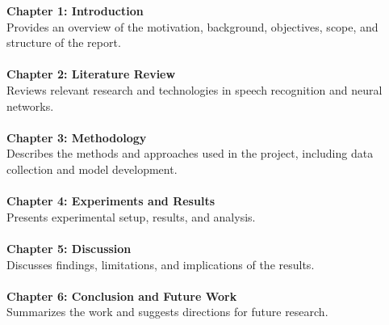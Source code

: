\textbf{\large Chapter 1: Introduction} \\
    Provides an overview of the motivation, background, objectives, scope, and structure of the report.
\\\\
\textbf{\large Chapter 2: Literature Review} \\
    Reviews relevant research and technologies in speech recognition and neural networks.
\\\\
\textbf{\large Chapter 3: Methodology} \\
    Describes the methods and approaches used in the project, including data collection and model development.
\\\\
\textbf{\large Chapter 4: Experiments and Results} \\
    Presents experimental setup, results, and analysis.
\\\\
\textbf{\large Chapter 5: Discussion} \\
    Discusses findings, limitations, and implications of the results.
\\\\
\textbf{\large Chapter 6: Conclusion and Future Work} \\
    Summarizes the work and suggests directions for future research.


